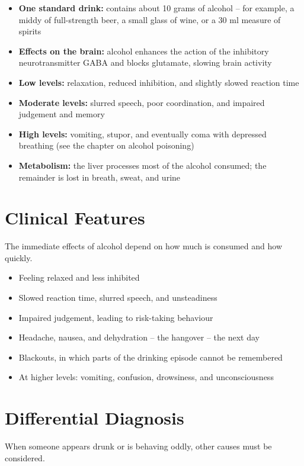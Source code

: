 \begin{itemize}
    \item \textbf{One standard drink:} contains about 10 grams of alcohol -- for example, a middy of full-strength beer, a small glass of wine, or a 30 ml measure of spirits
    \item \textbf{Effects on the brain:} alcohol enhances the action of the inhibitory neurotransmitter GABA and blocks glutamate, slowing brain activity
    \item \textbf{Low levels:} relaxation, reduced inhibition, and slightly slowed reaction time
    \item \textbf{Moderate levels:} slurred speech, poor coordination, and impaired judgement and memory
    \item \textbf{High levels:} vomiting, stupor, and eventually coma with depressed breathing (see the chapter on alcohol poisoning)
    \item \textbf{Metabolism:} the liver processes most of the alcohol consumed; the remainder is lost in breath, sweat, and urine
\end{itemize}

\section*{Clinical Features}
The immediate effects of alcohol depend on how much is consumed and how quickly.

\begin{itemize}
    \item Feeling relaxed and less inhibited
    \item Slowed reaction time, slurred speech, and unsteadiness
    \item Impaired judgement, leading to risk-taking behaviour
    \item Headache, nausea, and dehydration -- the hangover -- the next day
    \item Blackouts, in which parts of the drinking episode cannot be remembered
    \item At higher levels: vomiting, confusion, drowsiness, and unconsciousness
\end{itemize}

\section*{Differential Diagnosis}
When someone appears drunk or is behaving oddly, other causes must be considered.

